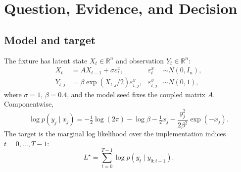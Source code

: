 \documentclass[11pt]{article}
\begin{document}
\begin{abstract}
The frozen-state test subsequently localized the dominant immediate $t=3$
error to the fitted normalizer: the exact Hermite Gram contains about $4.62$
times the fitted energy seen on the training rows.  The active repair therefore
returns to Zhao--Cui Algorithm~3.  The fitted squared TT supplies the
observation-conditioned conditional KR proposal, one continuation is drawn for
each existing particle without auxiliary ancestor selection, and the exact
transition and observation densities correct the fitted proposal.  A UKF or a
positive likelihood-weighted sigma-point rule may guide the coordinates in
which that same TT is fitted; it does not replace the TT proposal.  This report
derives the resulting proposal density, Jacobian, particle weights, and
same-scalar analytical score, and separates the source-faithful Algorithm~3
baseline from the UKF-guided extension that still requires executable tests.
The paired-current/previous construction in Section~\ref{sec:paired-repair}
now has a completed diagnostic comparison. An incorrect conditional Gram
contraction was localized and repaired without refitting the saved proposals.
The repaired pair proposal passes the declared filtering-mean and log-evidence
screens in one and four dimensions, but its observed conditional mean errors
still exceed simple heuristics in several observation regimes. The tested
configuration therefore remains unpromoted; four particle seeds on one
observation sequence do not establish a ranking.
\end{abstract}

\section{Question, Evidence, and Decision}

\subsection{Model and target}

The fixture has latent state $X_t\in\mathbb{R}^n$ and observation
$Y_t\in\mathbb{R}^n$:
\begin{align}
X_t &= A X_{t-1}+\sigma\varepsilon^x_t,
&\varepsilon^x_t&\sim N(0,I_n),\\
Y_{t,j} &= \beta \exp(X_{t,j}/2)\varepsilon^y_{t,j},
&\varepsilon^y_{t,j}&\sim N(0,1),
\end{align}
where $\sigma=1$, $\beta=0.4$, and the model seed fixes the coupled matrix
$A$. Componentwise,
\begin{equation}\label{eq:obs-log}
\log p(y_j\mid x_j)
=-\tfrac12\log(2\pi)-\log\beta-\tfrac12x_j
  -\frac{y_j^2}{2\beta^2}\exp(-x_j).
\end{equation}
The target is the marginal log likelihood over the implementation indices
$t=0,\ldots,T-1$:
\begin{equation}
L^\star=\sum_{t=0}^{T-1}\log p(y_t\mid y_{0:t-1}).
\end{equation}
\end{document}
